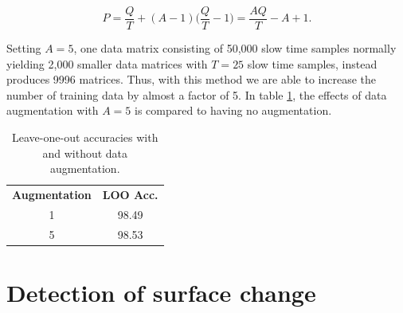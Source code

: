 \begin{equation}
	P = 
	\frac{Q}{T} + (A-1)\Big(\frac{Q}{T} - 1\Big) = 
	\frac{AQ}{T}-A+1.
\end{equation}

Setting $A=5$, one data matrix consisting of 50,000 slow time samples normally yielding 2,000 smaller data matrices with $T=25$ slow time samples, instead produces 9996 matrices. Thus, with this method we are able to increase the number of training data by almost a factor of 5. In table \ref{tab:aug}, the effects of data augmentation with $A=5$ is compared to having no augmentation.


\begin{table}
	\label{tab:aug}
	\begin{center}
		\begin{tabular}{|c|c|}
			\hline
			\rowcolor{gray!150}
			\color{white}\textbf{Augmentation} & \color{white}\textbf{LOO Acc.} \\
			1 & 98.49 \\
			5 & 98.53 \\
			\hline
		\end{tabular}
	\end{center}
	\caption{Leave-one-out accuracies with and without data augmentation.}
\end{table}



\section{Detection of surface change}

